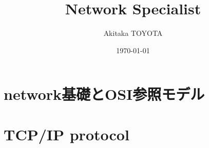 \documentclass[uplatex,11pt,a4j]{jsarticle}
\title{\vspace{-10mm}Network Specialist}
\author{Akitaka TOYOTA}
\date{\today}
\begin{document}
    \maketitle

    \section{network基礎とOSI参照モデル}
    
    

    \section{TCP/IP protocol}
    
\end{document}
